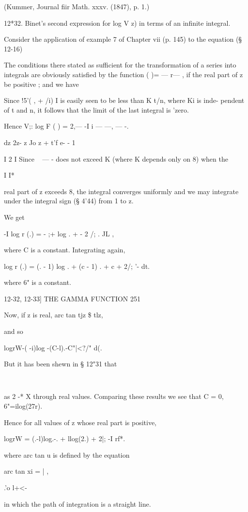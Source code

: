 (Kummer, Journal fiir Math. xxxv. (1847), p. 1.)

12*32. Binet's second expression for log V z) in terms of an infinite
integral.

Consider the application of example 7 of Chapter vii (p. 145) to the
equation (§ 12-16)

The conditions there stated as sufficient for the transformation of a
series into integrals are obviously satisfied by the function ( )= —
r— , if the real part of z be positive ; and we have

Since !5'( , + /i) I is easily seen to be less than K t/n, where Ki is
inde- pendent of t and n, it follows that the limit of the last
integral is 'zero.

Hence V;: log F ( ) = 2,— -I i — —, — -.

dz 2z- z Jo z + t'f e- - 1

I 2 I Since ~ — - does not exceed K (where K depends only on 8) when
the

I I*

real part of z exceeds 8, the integral converges uniformly and we may
integrate under the integral sign (§ 4'44) from 1 to z.

We get

-I log r (.) = - ;+ log . + - 2 /; . JL ,

where C is a constant. Integrating again,

log r (.) = (. - 1) log . + (c - 1) . + c + 2/; '- dt.

where 6" is a constant.

12-32, 12-33] THE GAMMA FUNCTION 251

Now, if z is real, arc tan tjz \$ tlz,

and so

logrW-( -i)log -(C-l).-C"|<?/" d(.

But it has been shewn in § 12"31 that

\ \ %

as 2 -* X through real values. Comparing these results we see that C =
0, 6"=ilog(27r).

Hence for all values of z whose real part is positive,

logrW = (.-l)log.-. + llog(2.) + 2|; -I rf*.

where arc tan u is defined by the equation

arc tan xi = | ,

.'o l+<-

in which the path of integration is a straight line.

